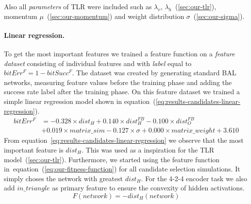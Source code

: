 Also all \emph{parameters} of TLR were included such as $\lambda_v$, $\lambda_h$~(\ref{sec:our-tlr}), momentum $\mu$~(\ref{sec:our-momentum}) and weight distribution $\sigma$~(\ref{sec:our-sigma}). 

\paragraph{Linear regression.}
To get the most important features we trained a feature function on a \emph{feature dataset} consisting of individual features and with \emph{label} equal to $bitErr^F = 1-bitSucc^F$. The dataset was created by generating standard BAL networks, measuring feature values before the training phase and adding the success rate label after the training phase. On this feature dataset we trained a simple linear regression model shown in equation~(\ref{eq:results-candidates-linear-regression}).
\begin{align} 
\label{eq:results-candidates-linear-regression} 
bitErr^F &= 
- 0.328 \times dist_{H}
+ 0.140 \times dist_{H}^{FB}
- 0.100 \times dist_{O}^{FB} \nonumber \\
&+ 0.019 \times matrix\_sim
- 0.127 \times \sigma
+ 0.000 \times matrix\_weight
+ 3.610
\end{align}  
From equation~\ref{eq:results-candidates-linear-regression} we observe that the most important feature is $dist_{H}$. This was used as a inspiration for the TLR model~(\ref{sec:our-tlr}). Furthermore, we started using the feature function in~equation~(\ref{eq:our-fitness-function}) for all candidate selection simulations. It simply choses the network with greatest $dist_{H}$. For the 4-2-4 encoder task we also add $in\_triangle$ as primary feature to ensure the convexity of hidden activations. 
\begin{equation} 
\label{eq:our-fitness-function} 
  F(network) = -dist_{H}(network)
\end{equation} 




